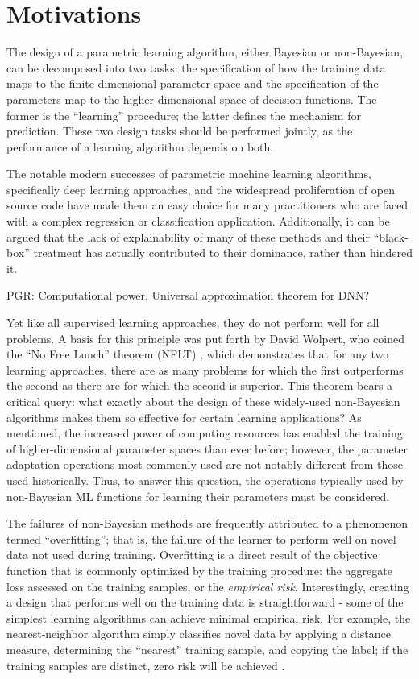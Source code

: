 \documentclass[12pt]{article}
\begin{document}
\newpage
\section{Motivations} \label{sec:motivation}

The design of a parametric learning algorithm, either Bayesian or non-Bayesian, can be decomposed into two tasks: the specification of how the training data maps to the finite-dimensional parameter space and the specification of the parameters map to the higher-dimensional space of decision functions. The former is the ``learning'' procedure; the latter defines the mechanism for prediction. These two design tasks should be performed jointly, as the performance of a learning algorithm depends on both. 


The notable modern successes of parametric machine learning algorithms, specifically deep learning approaches, and the widespread proliferation of open source code \cite{tensorflow} have made them an easy choice for many practitioners who are faced with a complex regression or classification application. Additionally, it can be argued that the lack of explainability of many of these methods and their ``black-box'' treatment has actually contributed to their dominance, rather than hindered it. 

PGR: Computational power, Universal approximation theorem for DNN?

Yet like all supervised learning approaches, they do not perform well for all problems. A basis for this principle was put forth by David Wolpert, who coined the ``No Free Lunch'' theorem (NFLT) \cite{wolpert}, which demonstrates that for any two learning approaches, there are as many problems for which the first outperforms the second as there are for which the second is superior. This theorem bears a critical query: what exactly about the design of these widely-used non-Bayesian algorithms makes them so effective for certain learning applications? As mentioned, the increased power of computing resources has enabled the training of higher-dimensional parameter spaces than ever before; however, the parameter adaptation operations most commonly used are not notably different from those used historically. Thus, to answer this question, the operations typically used by non-Bayesian ML functions for learning their parameters must be considered.

The failures of non-Bayesian methods are frequently attributed to a phenomenon termed ``overfitting''; that is, the failure of the learner to perform well on novel data not used during training. Overfitting is a direct result of the objective function that is commonly optimized by the training procedure: the aggregate loss assessed on the training samples, or the \emph{empirical risk}. Interestingly, creating a design that performs well on the training data is straightforward - some of the simplest learning algorithms can achieve minimal empirical risk. For example, the nearest-neighbor algorithm simply classifies novel data by applying a distance measure, determining the ``nearest'' training sample, and copying the label; if the training samples are distinct, zero risk will be achieved \cite{devroye}. 
\end{document}
